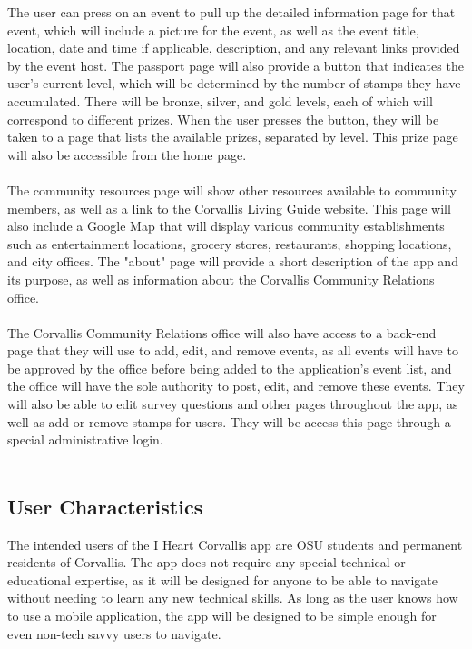 \documentclass[draftclsnofoot, onecolumn, 10pt, compsoc]{IEEEtran}
\begin{document}
			The user can press on an event to pull up the detailed information page for that event, which will include a picture for the event, as well as the event title, location, date and time if applicable, description, and any relevant links provided by the event host. The passport page will also provide a button that indicates the user's current level, which will be determined by the number of stamps they have accumulated. There will be bronze, silver, and gold levels, each of which will correspond to different prizes. When the user presses the button, they will be taken to a page that lists the available prizes, separated by level. This prize page will also be accessible from the home page. \\ \\
			The community resources page will show other resources available to community members, as well as a link to the Corvallis Living Guide website. This page will also include a Google Map that will display various community establishments such as entertainment locations, grocery stores, restaurants, shopping locations, and city offices. The "about" page will provide a short description of the app and its purpose, as well as information about the Corvallis Community Relations office. \\ \\
			The Corvallis Community Relations office will also have access to a back-end page that they will use to add, edit, and remove events, as all events will have to be approved by the office before being added to the application's event list, and the office will have the sole authority to post, edit, and remove these events. They will also be able to edit survey questions and other pages throughout the app, as well as add or remove stamps for users. They will be access this page through a special administrative login. \\ \\

		\subsection{User Characteristics}
			The intended users of the I Heart Corvallis app are OSU students and permanent residents of Corvallis. The app does not require any special technical or educational expertise, as it will be designed for anyone to be able to navigate without needing to learn any new technical skills. As long as the user knows how to use a mobile application, the app will be designed to be simple enough for even non-tech savvy users to navigate.
\end{document}
